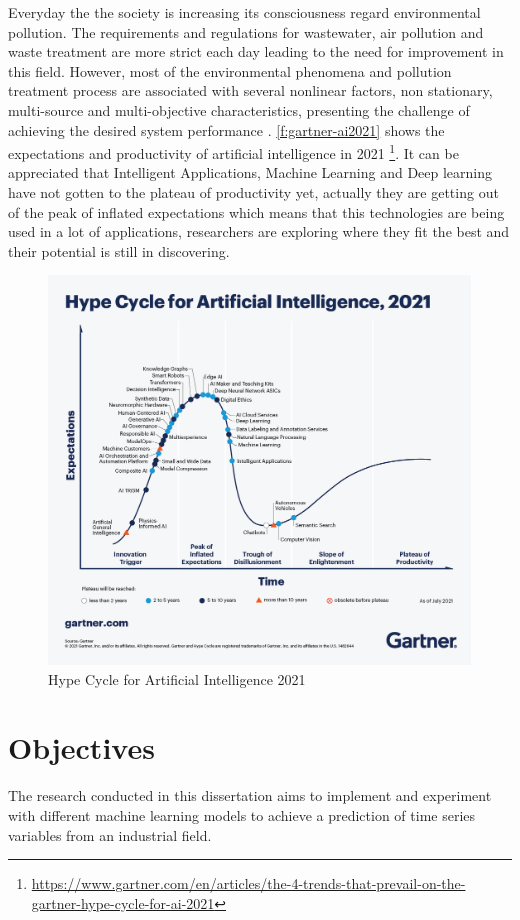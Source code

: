 Everyday the the society is increasing its consciousness regard environmental pollution. The  requirements and regulations for wastewater, air pollution and waste treatment are more strict each day leading to the need for improvement in this field. However, most of the environmental phenomena and pollution treatment process are associated with several nonlinear factors, non stationary, multi-source and multi-objective characteristics, presenting the challenge of achieving the desired system performance \cite{Ye2020}. \autoref{f:gartner-ai2021} shows the expectations and productivity of artificial intelligence in 2021 \footnote{\url{https://www.gartner.com/en/articles/the-4-trends-that-prevail-on-the-gartner-hype-cycle-for-ai-2021}}. It can be appreciated that Intelligent Applications, Machine Learning and Deep learning have not gotten to the plateau of productivity yet, actually they are getting out of the peak of inflated expectations which means that this technologies are being used in a lot of applications, researchers are exploring where they fit the best and their potential is still in discovering. 

\begin{figure}[t]
\centering
\includegraphics[width=\linewidth]{figures/Ch1/gartner-ai2021.png}
\caption{Hype Cycle for Artificial Intelligence 2021}
\label{f:gartner-ai2021}
\end{figure}

\section{Objectives}
\label{s:Objectives}
The research conducted in this dissertation aims to implement and experiment with different machine learning models to achieve a prediction of time series variables from an industrial field.


